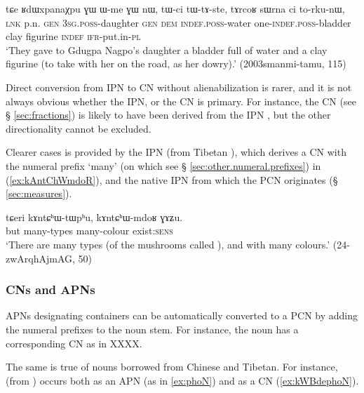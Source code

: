\begin{exe}
\ex \label{ex:tWci.tWtAste}
\gll  tɕe ʁdɯxpanaχpu ɣɯ ɯ-me ɣɯ nɯ, tɯ-ci tɯ-tɤ-ste, tɤrcoʁ sɯrna ci to-rku-nɯ, \\
 \textsc{lnk} p.n. \textsc{gen} \textsc{3sg}.\textsc{poss}-daughter \textsc{gen} \textsc{dem} \textsc{indef}.\textsc{poss}-water one-\textsc{indef}.\textsc{poss}-bladder clay figurine \textsc{indef} \textsc{ifr}-put.in-\textsc{pl} \\
\glt `They gave to Gdugpa Nagpo's daughter a bladder full of water and a clay figurine (to take with her on the road, as her dowry).' (2003smanmi-tamu, 115)
\end{exe}

Direct conversion from IPN to CN without alienabilization is rarer, and it is not always obvious whether the IPN, or the CN is primary. For instance, the CN  (see § \ref{sec:fractions}) is likely to have been derived from the IPN , but the other directionality cannot be excluded. 

Clearer cases is provided by the IPN   (from Tibetan ), which derives a CN with the numeral prefix  `many' (on which see § \ref{sec:other.numeral.prefixes}) in (\ref{ex:kAntChWmdoR}), and the native IPN  from which the PCN  originates (§ \ref{sec:measures}).

\begin{exe}
\ex \label{ex:kAntChWmdoR}
\gll  tɕeri kɤntɕʰɯ-tɯpʰu, kɤntɕʰɯ-mdoʁ ɣɤʑu. \\
 but many-types many-colour exist:\textsc{sens} \\
\glt  `There are many types (of the mushrooms called ), and with many colours.' (24-zwArqhAjmAG, 50)
\end{exe}

\subsubsection{CNs and APNs}   \label{sec:CN.APN}
APNs designating containers can be automatically converted to a PCN by adding the numeral prefixes to the noun stem. For instance, the noun  has a corresponding CN   as in XXXX.

The same is true of nouns borrowed from Chinese and Tibetan. For instance,  (from ) occurs both as an APN (as in \ref{ex:phoN}) and as a CN (\ref{ex:kWBdephoN}).


